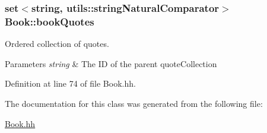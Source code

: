 \subsubsection[{\texorpdfstring{book\+Quotes}{bookQuotes}}]{\setlength{\rightskip}{0pt plus 5cm}set$<$string, {\bf utils\+::string\+Natural\+Comparator}$>$ Book\+::book\+Quotes\hspace{0.3cm}{\ttfamily [private]}}\hypertarget{class_book_ae68f8cb5ab781aa3dad4f5ed90b3057e}{}\label{class_book_ae68f8cb5ab781aa3dad4f5ed90b3057e}


Ordered collection of quotes. 


\begin{DoxyParams}{Parameters}
{\em string} & The ID of the parent quote\+Collection \\
\hline
\end{DoxyParams}


Definition at line 74 of file Book.\+hh.



The documentation for this class was generated from the following file\+:\begin{DoxyCompactItemize}
\item 
\hyperlink{_book_8hh}{Book.\+hh}\end{DoxyCompactItemize}
